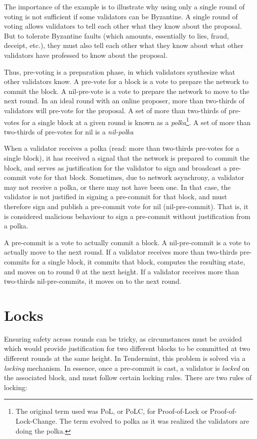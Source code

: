 The importance of the example is to illustrate why using only a single round of voting
is not sufficient if some validators can be Byzantine.
A single round of voting allows validators to tell each other what they know about the proposal.	
But to tolerate Byzantine faults (which amounts, essentially to lies, fraud, deceipt, etc.), 
they must also tell each other what they know about what other validators have professed to know about the proposal.

Thus, pre-voting is a preparation phase, in which validators synthesize what other validators know.
A pre-vote for a block is a vote to prepare the network to commit the block.
A nil-pre-vote is a vote to prepare the network to move to the next round.
In an ideal round with an online proposer, more than two-thirds of validators will pre-vote for the proposal.
A set of more than two-thirds of pre-votes for a single block at a given round is known as a \emph{polka}\footnote{The original term used was PoL, or PoLC, for Proof-of-Lock or Proof-of-Lock-Change. The term evolved to polka as it was realized the validators are doing the polka.}.
A set of more than two-thirds of pre-votes for nil is a \emph{nil-polka}

When a validator receives a polka (read: more than two-thirds pre-votes for a single block), 
it has received a signal that the network is prepared to commit the block,
and serves as justification for the validator to sign and broadcast a pre-commit vote for that block.
Sometimes, due to network asynchrony, a validator may not receive a polka, or there may not have been one. 
In that case, the validator is not justified in signing a pre-commit for that block, 
and must therefore sign and publish a pre-commit vote for nil (nil-pre-commit).
That is, it is considered malicious behaviour to sign a pre-commit without justification from a polka.

A pre-commit is a vote to actually commit a block.
A nil-pre-commit is a vote to actually move to the next round.
If a validator receives more than two-thirds pre-commits for a single block, 
it commits that block, computes the resulting state,
and moves on to round 0 at the next height.
If a validator receives more than two-thirds nil-pre-commits,
it moves on to the next round.

\section{Locks}

Ensuring safety across rounds can be tricky, 
as circumstances must be avoided which would provide justification for two different blocks to be committed at two different rounds at the same height.
In Tendermint, this problem is solved via a \emph{locking} mechanism.
In essence, once a pre-commit is cast, a validator is \emph{locked} on the associated block, and must follow certain locking rules.
There are two rules of locking:

